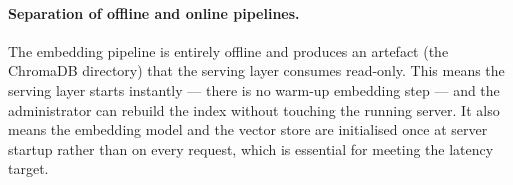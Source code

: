 \paragraph{Separation of offline and online pipelines.}
The embedding pipeline is entirely offline and produces an artefact (the ChromaDB directory) that the serving layer consumes read-only. This means the serving layer starts instantly — there is no warm-up embedding step — and the administrator can rebuild the index without touching the running server. It also means the embedding model and the vector store are initialised once at server startup rather than on every request, which is essential for meeting the latency target.


